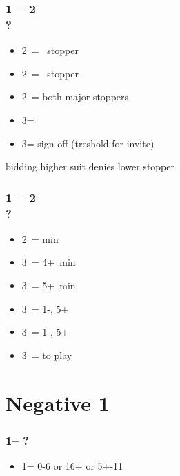 \documentclass[12pt, a4paper]{report}
\begin{document}
{{        \subsubsection*{1\diams\ -- 2\diams \\ ?}
        \begin{itemize}
            \item 2\hearts\ = \hearts\ stopper
            \item 2\spades\ = \spades\ stopper
            \item 2\nt\ = both major stoppers
            \item 3\clubs = \nat
            \item 3\diams = sign off (treshold for invite)
        \end{itemize}

        bidding higher suit denies lower stopper

        \subsubsection*{1\diams\ -- 2\spades \\ ?}
        \begin{itemize}
            \item 2\nt\ = \bal min
            \item 3\clubs\ = 4+\clubs\ min
            \item 3\diams\ = 5+\diams\ min
            \item 3\hearts\ = 1-\hearts, 5+\diams\ \gf
            \item 3\spades\ = 1-\spades, 5+\diams\ \gf
            \item 3\nt\ = to play
        \end{itemize}
    }

    \section*{\colorbox{blue!30}{Negative 1\diams}}
     {

        \subsubsection*{1\clubs -- ?}
        \begin{itemize}
            \item 1\diams = 0-6 or 16+ \bal or 5+-11
        \end{itemize}

}}
\end{document}
